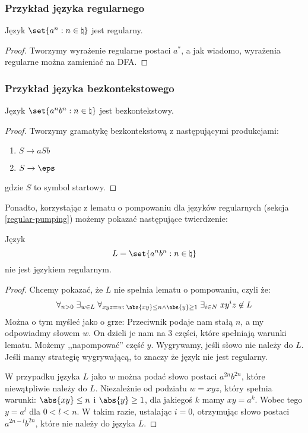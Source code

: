 \subsubsection{Przykład języka regularnego}

\begin{theorem}
Język \( \set{a^n : n \in \natural} \) jest regularny. 
\end{theorem}
\begin{proof}
Tworzymy wyrażenie regularne postaci \(a^*\), a jak wiadomo, wyrażenia regularne można zamieniać na DFA.
\end{proof}

\subsubsection{Przykład języka bezkontekstowego}
\label{cfl_example}

\begin{theorem}
Język  \( \set{a^nb^n : n \in \natural} \) jest bezkontekstowy.
\end{theorem}
\begin{proof}
    Tworzymy gramatykę bezkontekstową z następującymi produkcjami: \begin{enumerate}
        \item \(S \rightarrow aSb \)
        \item \(S \rightarrow \eps \)
    \end{enumerate}
    gdzie \(S\) to symbol startowy.
\end{proof}

Ponadto, korzystając z lematu o pompowaniu dla języków regularnych (sekcja \ref{regular-pumping}) możemy pokazać następujące twierdzenie:
\begin{theorem}
    Język
    \[
        L = \set{a^nb^n : n \in \natural}
    \]
    nie jest językiem regularnym.
\end{theorem}

\begin{proof}
    Chcemy pokazać, że \(L\) nie spełnia lematu o pompowaniu, czyli że: 
    \[
        \forall_{n>0}\; \exists_{w \in L}\; \forall_{xyz=w :\: \abs{xy} \leq n \land \abs{y} \geq 1}\; \exists_{i \in N}\; xy^iz \not \in L 
    \] 
    Można o tym myśleć jako o grze: Przeciwnik podaje nam stałą \(n\), a my odpowiadmy słowem \( w \). On dzieli je nam na 3 części, które spełniają warunki lematu. Możemy ,,napompować'' część \(y\). Wygrywamy, jeśli słowo nie należy do \(L\). Jeśli mamy strategię wygrywającą, to znaczy że język nie jest regularny. 
    
    W przypadku języka \( L \) jako \( w \) można podać słowo postaci \(a^{2n}b^{2n}\), które niewątpliwie należy do \(L\).
    Niezależnie od podziału \( w = xyz\), który spełnia warunki: \(\abs{xy} \leq n \) i \(\abs{y} \geq 1\), dla jakiegoś \(k\) mamy \(xy = a^k\). Wobec tego \(y = a^l\) dla \( 0 < l < n \). W takim razie, ustalając \(i = 0\), otrzymując słowo postaci \(a^{2n-l}b^{2n}\), które nie należy do języka \( L \). 
\end{proof}

